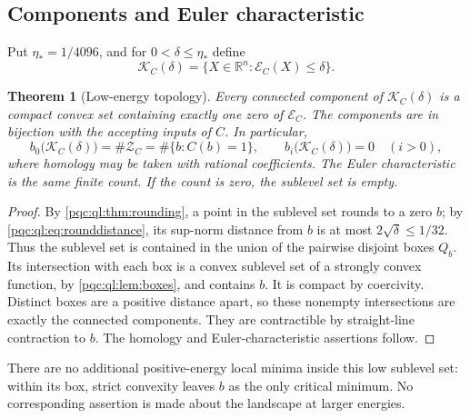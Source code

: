 \documentclass[11pt,letterpaper]{article}
\numberwithin{equation}{section}
\newtheorem{theorem}{Theorem}[section]
\theoremstyle{definition}
\theoremstyle{remark}
\newcommand{\R}{\mathbb R}
\newcommand{\cE}{\mathcal E}
\newcommand{\cK}{\mathcal K}
\newcommand{\cZ}{\mathcal Z}
\newcommand{\etastar}{\eta_*}
\begin{document}
\subsection{Components and Euler characteristic}
Put $\etastar=1/4096$, and for $0<\delta\le\etastar$ define
\[
 \cK_C(\delta)=\{X\in\R^n:\cE_C(X)\le\delta\}.
\]
\begin{theorem}[Low-energy topology]\label{pqc:ql:thm:topology}
Every connected component of $\cK_C(\delta)$ is a compact convex set
containing exactly one zero of $\cE_C$. The components are in bijection
with the accepting inputs of $C$. In particular,
\begin{equation}\label{pqc:ql:eq:betti}
 b_0\bigl(\cK_C(\delta)\bigr)
 =\#\cZ_C=\#\{b:C(b)=1\},\qquad
 b_i\bigl(\cK_C(\delta)\bigr)=0\quad(i>0),
\end{equation}
where homology may be taken with rational coefficients. The Euler
characteristic is the same finite count. If the count is zero, the
sublevel set is empty.
\end{theorem}
\begin{proof}
By \cref{pqc:ql:thm:rounding}, a point in the sublevel set rounds to a zero $b$;
by \eqref{pqc:ql:eq:rounddistance}, its sup-norm distance from $b$ is at most
$2\sqrt\delta\le1/32$. Thus the sublevel set is contained in the union of
the pairwise disjoint boxes $Q_b$. Its intersection with each box is a
convex sublevel set of a strongly convex function, by \cref{pqc:ql:lem:boxes}, and
contains $b$. It is compact by coercivity. Distinct boxes are a positive
distance apart, so these nonempty intersections are exactly the connected
components. They are contractible by straight-line contraction to $b$.
The homology and Euler-characteristic assertions follow.
\end{proof}

There are no additional positive-energy local minima inside this low
sublevel set: within its box, strict convexity leaves $b$ as the only
critical minimum. No corresponding assertion is made about the landscape
at larger energies.
\end{document}
